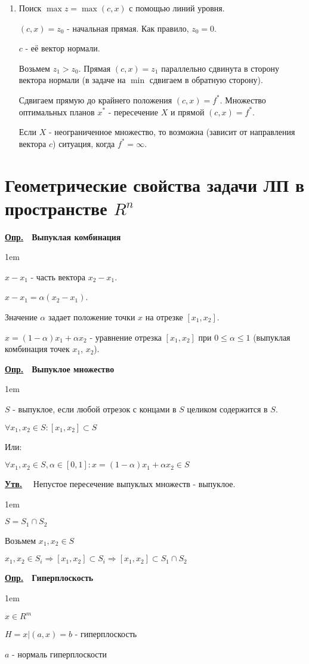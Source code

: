 \documentclass[11pt]{article}
\newenvironment{df}[1]{
  \underline{\textbf{Опр.}}\ \ \textbf{#1}
  
  \begin{adjustwidth}{1em}{}
}{
  \end{adjustwidth}
}
\newenvironment{statement}[1]{
  \underline{\textbf{Утв.}}\ \ #1
    
  \begin{adjustwidth}{1em}{}
}{
  \end{adjustwidth}
}
\begin{document}
\begin{sloppypar}
\begin{enumerate}
  \item Поиск $\max z = \max (c, x)$ с помощью линий уровня.
  
  $(c, x) = z_0$ - начальная прямая. Как правило, $z_0 = 0$.
  
  $c$ - её вектор нормали.
  
  Возьмем $z_1 > z_0$. Прямая $(c, x) = z_1$ параллельно сдвинута в сторону вектора нормали (в задаче на $\min$ сдвигаем в обратную сторону).
  
  Сдвигаем прямую до крайнего положения $(c, x) = f^*$. Множество оптимальных планов $x^*$ - пересечение $X$ и прямой $(c, x) = f^*$.
  
  Если $X$ - неограниченное множество, то возможна (зависит от направления вектора $c$) ситуация, когда $f^* = \infty$.
\end{enumerate}

\section*{Геометрические свойства задачи ЛП в пространстве $R^n$}
\begin{df}{Выпуклая комбинация}

  $x - x_1$ - часть вектора $x_2 - x_1$.
  
  $x - x_1 = \alpha(x_2 - x_1)$.
  
  Значение $\alpha$ задает положение точки $x$ на отрезке $[x_1, x_2]$.
  
  $x = (1 - \alpha)x_1 + \alpha x_2$ - уравнение отрезка $[x_1, x_2]$ при $0 \leq \alpha \leq 1$ (выпуклая комбинация точек $x_1$, $x_2$).
\end{df}

\begin{df}{Выпуклое множество}
  $S$ - выпуклое, если любой отрезок с концами в $S$ целиком содержится в $S$.
  
  $\forall x_1, x_2 \in S: [x_1, x_2] \subset S$
  
  Или:
  
  $\forall x_1, x_2 \in S, \alpha \in [0, 1]: x = (1 - \alpha)x_1 + \alpha x_2 \in S$
\end{df}

\begin{statement}{
  Непустое пересечение выпуклых множеств - выпуклое.
}
  $S = S_1 \cap S_2$

  Возьмем $x_1, x_2 \in S$
  
  $x_1, x_2 \in S_i \Rightarrow [x_1, x_2] \subset S_i \Rightarrow [x_1, x_2] \subset S_1 \cap S_2$
\end{statement}

\begin{df}{Гиперплоскость}
  $x \in R^m$

  $H = {x|(a, x) = b}$ - гиперплоскость
  
  $a$ - нормаль гиперплоскости
\end{df}

\end{sloppypar}
\end{document}
